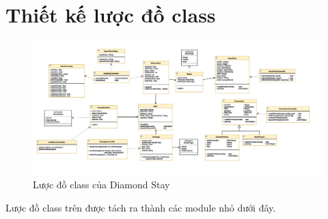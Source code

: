 \newpage
\section{Thiết kế lược đồ class}
\begin{figure}[H]
	\centering
	\includegraphics[width=14cm]{Image/777.png}
	\vspace{0.5cm}
	\caption{Lược đồ class của Diamond Stay}
\end{figure}
Lược đồ class trên được tách ra thành các module nhỏ dưới đây.

% 

% 
% 
